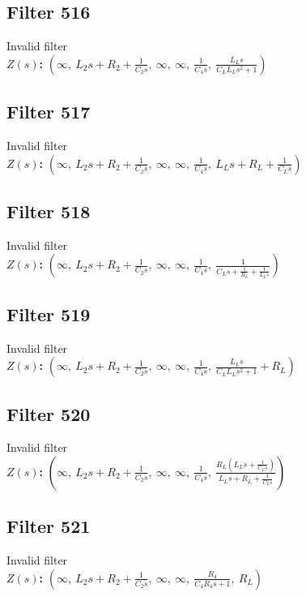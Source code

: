 \documentclass{article}
\begin{document}
\subsection*{Filter 516}
Invalid filter \\ 
\textbf{$Z(s)$:} $\left( \infty, \  L_{2} s + R_{2} + \frac{1}{C_{2} s}, \  \infty, \  \infty, \  \frac{1}{C_{4} s}, \  \frac{L_{L} s}{C_{L} L_{L} s^{2} + 1}\right)$ \\ 
\subsection*{Filter 517}
Invalid filter \\ 
\textbf{$Z(s)$:} $\left( \infty, \  L_{2} s + R_{2} + \frac{1}{C_{2} s}, \  \infty, \  \infty, \  \frac{1}{C_{4} s}, \  L_{L} s + R_{L} + \frac{1}{C_{L} s}\right)$ \\ 
\subsection*{Filter 518}
Invalid filter \\ 
\textbf{$Z(s)$:} $\left( \infty, \  L_{2} s + R_{2} + \frac{1}{C_{2} s}, \  \infty, \  \infty, \  \frac{1}{C_{4} s}, \  \frac{1}{C_{L} s + \frac{1}{R_{L}} + \frac{1}{L_{L} s}}\right)$ \\ 
\subsection*{Filter 519}
Invalid filter \\ 
\textbf{$Z(s)$:} $\left( \infty, \  L_{2} s + R_{2} + \frac{1}{C_{2} s}, \  \infty, \  \infty, \  \frac{1}{C_{4} s}, \  \frac{L_{L} s}{C_{L} L_{L} s^{2} + 1} + R_{L}\right)$ \\ 
\subsection*{Filter 520}
Invalid filter \\ 
\textbf{$Z(s)$:} $\left( \infty, \  L_{2} s + R_{2} + \frac{1}{C_{2} s}, \  \infty, \  \infty, \  \frac{1}{C_{4} s}, \  \frac{R_{L} \left(L_{L} s + \frac{1}{C_{L} s}\right)}{L_{L} s + R_{L} + \frac{1}{C_{L} s}}\right)$ \\ 
\subsection*{Filter 521}
Invalid filter \\ 
\textbf{$Z(s)$:} $\left( \infty, \  L_{2} s + R_{2} + \frac{1}{C_{2} s}, \  \infty, \  \infty, \  \frac{R_{4}}{C_{4} R_{4} s + 1}, \  R_{L}\right)$ \\ 
\end{document}
